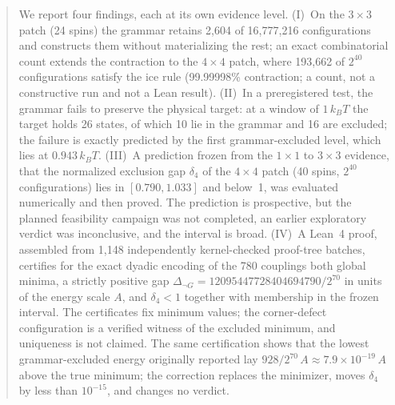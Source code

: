\documentclass[11pt,a4paper]{article}
\theoremstyle{plain}
\theoremstyle{definition}
\theoremstyle{remark}
\begin{document}
\begin{abstract}
We report four findings, each at its own evidence level. (I)~On the $3\times3$ patch (24 spins) the grammar retains 2{,}604 of 16{,}777{,}216 configurations and constructs them without materializing the rest; an exact combinatorial count extends the contraction to the $4\times4$ patch, where 193{,}662 of $2^{40}$ configurations satisfy the ice rule (99.99998\% contraction; a count, not a constructive run and not a Lean result). (II)~In a preregistered test, the grammar fails to preserve the physical target: at a window of $1\,k_BT$ the target holds 26 states, of which 10 lie in the grammar and 16 are excluded; the failure is exactly predicted by the first grammar-excluded level, which lies at $0.943\,k_BT$. (III)~A prediction frozen from the $1\times1$ to $3\times3$ evidence, that the normalized exclusion gap $\delta_4$ of the $4\times4$ patch (40 spins, $2^{40}$ configurations) lies in $[0.790,1.033]$ and below~1, was evaluated numerically and then proved. The prediction is prospective, but the planned feasibility campaign was not completed, an earlier exploratory verdict was inconclusive, and the interval is broad. (IV)~A Lean~4 proof, assembled from 1{,}148 independently kernel-checked proof-tree batches, certifies for the exact dyadic encoding of the 780 couplings both global minima, a strictly positive gap $\Delta_{\neg G}=12095447728404694790/2^{70}$ in units of the energy scale $A$, and $\delta_4<1$ together with membership in the frozen interval. The certificates fix minimum values; the corner-defect configuration is a verified witness of the excluded minimum, and uniqueness is not claimed. The same certification shows that the lowest grammar-excluded energy originally reported lay $928/2^{70}\,A\approx7.9\times10^{-19}\,A$ above the true minimum; the correction replaces the minimizer, moves $\delta_4$ by less than $10^{-15}$, and changes no verdict.


\end{abstract}
\end{document}
